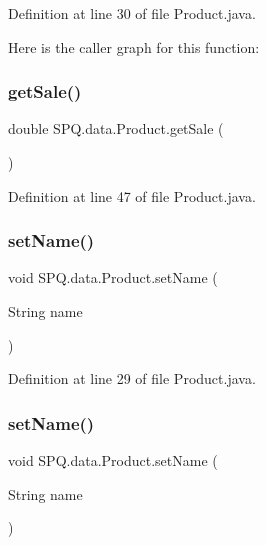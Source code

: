 Definition at line 30 of file Product.\+java.

Here is the caller graph for this function\+:
\mbox{\label{class_s_p_q_1_1data_1_1_product_a07ba2dea61bb96215609776cc4d7058d}} 
\subsubsection{\texorpdfstring{get\+Sale()}{getSale()}\hspace{0.1cm}{\footnotesize\ttfamily [2/2]}}
{\footnotesize\ttfamily double S\+P\+Q.\+data.\+Product.\+get\+Sale (\begin{DoxyParamCaption}{ }\end{DoxyParamCaption})}



Definition at line 47 of file Product.\+java.

\mbox{\label{class_s_p_q_1_1data_1_1_product_a257a5e290694db0588a9ac9aad598360}} 
\subsubsection{\texorpdfstring{set\+Name()}{setName()}\hspace{0.1cm}{\footnotesize\ttfamily [1/2]}}
{\footnotesize\ttfamily void S\+P\+Q.\+data.\+Product.\+set\+Name (\begin{DoxyParamCaption}\item[{String}]{name }\end{DoxyParamCaption})}



Definition at line 29 of file Product.\+java.

\mbox{\label{class_s_p_q_1_1data_1_1_product_a257a5e290694db0588a9ac9aad598360}} 
\subsubsection{\texorpdfstring{set\+Name()}{setName()}\hspace{0.1cm}{\footnotesize\ttfamily [2/2]}}
{\footnotesize\ttfamily void S\+P\+Q.\+data.\+Product.\+set\+Name (\begin{DoxyParamCaption}\item[{String}]{name }\end{DoxyParamCaption})}




